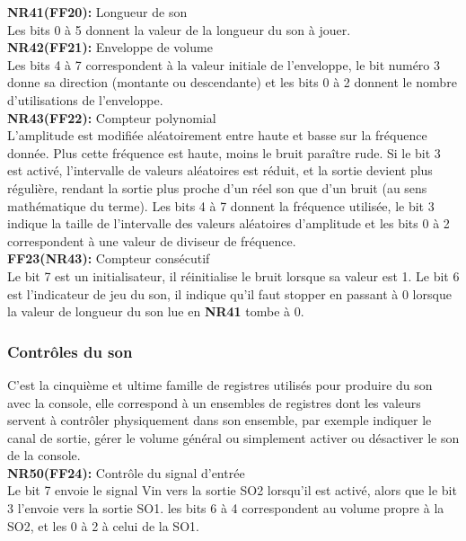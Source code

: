 \documentclass{report}
\begin{document}
	\textbf{NR41(FF20):} Longueur de son \\
		Les bits 0 à 5 donnent la valeur de la longueur du son
		à jouer.\\

	\textbf{NR42(FF21):} Enveloppe de volume\\
		Les bits 4 à 7 correspondent à la valeur initiale de
		l'enveloppe, le bit numéro 3 donne sa direction
		(montante ou descendante) et les bits 0 à 2 donnent le
		nombre d'utilisations de l'enveloppe.\\

	\textbf{NR43(FF22):} Compteur polynomial \\
		L'amplitude est modifiée aléatoirement entre haute et
		basse sur la fréquence donnée. Plus cette fréquence
		est haute, moins le bruit paraître rude. 
		Si le bit 3 est activé, l'intervalle de valeurs
		aléatoires est réduit, et la sortie devient plus
		régulière, rendant la sortie plus proche d'un réel
		son que d'un bruit (au sens mathématique du terme).
		Les bits 4 à 7 donnent la fréquence utilisée, le bit 3
		indique la taille de l'intervalle des valeurs
		aléatoires d'amplitude et les bits 0 à 2 correspondent
		à une valeur de diviseur de fréquence.\\ 

	\textbf{FF23(NR43):} Compteur consécutif\\
		Le bit 7 est un initialisateur, il réinitialise le bruit
		lorsque sa valeur est 1.
		Le bit 6 est l'indicateur de jeu du son, il indique
		qu'il faut stopper en passant à 0 lorsque la valeur de
		longueur du son lue en \textbf{NR41} tombe à 0. 
	\subsubsection{Contrôles du son}
		C'est la cinquième et ultime famille de registres
		utilisés pour produire du son avec la console, elle
		correspond à un ensembles de registres dont les
		valeurs servent à contrôler physiquement dans son
		ensemble, par exemple indiquer le canal de sortie,
		gérer le volume général ou simplement activer ou
		désactiver le son de la console. \\

	\textbf{NR50(FF24):} Contrôle du signal d'entrée \\ 
		Le bit 7 envoie le signal Vin vers la sortie SO2
		lorsqu'il est activé, alors que le bit 3 l'envoie vers
		la sortie SO1. les bits 6 à 4 correspondent au volume
		propre à la SO2, et les 0 à 2 à celui de la SO1. \\
\end{document}
